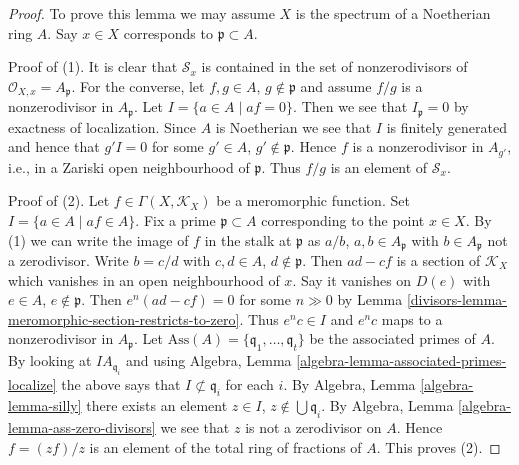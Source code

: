 \begin{proof}

To prove this lemma we may assume $X$ is the spectrum of a Noetherian
ring $A$. Say $x \in X$ corresponds to $\mathfrak p \subset A$.

\medskip\noindent
Proof of (1). It is clear that $\mathcal{S}_x$ is contained
in the set of nonzerodivisors of $\mathcal{O}_{X, x} = A_\mathfrak p$.
For the converse, let $f, g \in A$, $g \not \in \mathfrak p$ and
assume $f/g$ is a nonzerodivisor in $A_{\mathfrak p}$. Let
$I = \{a \in A \mid af = 0\}$. Then we see that $I_{\mathfrak p} = 0$ by
exactness of localization. Since $A$ is Noetherian we see that $I$
is finitely generated and hence that $g'I = 0$ for some $g' \in A$,
$g' \not \in \mathfrak p$. Hence $f$ is a nonzerodivisor
in $A_{g'}$, i.e., in a Zariski open neighbourhood of $\mathfrak p$.
Thus $f/g$ is an element of $\mathcal{S}_x$.

\medskip\noindent
Proof of (2). Let $f \in \Gamma(X, \mathcal{K}_X)$ be a meromorphic function.
Set $I = \{a \in A \mid af \in A\}$. Fix a prime $\mathfrak p \subset A$
corresponding to the point $x \in X$. By (1) we can write the image of $f$
in the stalk at $\mathfrak p$ as $a/b$, $a, b \in A_{\mathfrak p}$ with
$b \in A_{\mathfrak p}$ not a zerodivisor. Write $b = c/d$ with
$c, d \in A$, $d \not \in \mathfrak p$. Then $ad - cf$ is a section of
$\mathcal{K}_X$ which vanishes in an open neighbourhood of $x$. Say it
vanishes on $D(e)$ with $e \in A$, $e \not \in \mathfrak p$. Then
$e^n(ad - cf) = 0$ for some $n \gg 0$ by
Lemma \ref{divisors-lemma-meromorphic-section-restricts-to-zero}.
Thus $e^nc \in I$ and $e^nc$ maps to a nonzerodivisor in
$A_{\mathfrak p}$. Let
$\text{Ass}(A) = \{\mathfrak q_1, \ldots, \mathfrak q_t\}$ be the
associated primes of $A$. By looking at $IA_{\mathfrak q_i}$ and
using Algebra, Lemma \ref{algebra-lemma-associated-primes-localize}
the above says that
$I \not \subset \mathfrak q_i$ for each $i$. By
Algebra, Lemma \ref{algebra-lemma-silly}
there exists an element $z \in I$, $z \not \in \bigcup \mathfrak q_i$.
By Algebra, Lemma \ref{algebra-lemma-ass-zero-divisors}
we see that $z$ is not a zerodivisor on $A$.
Hence $f = (zf)/z$ is an element of the total ring of fractions of $A$.
This proves (2).
\end{proof}

